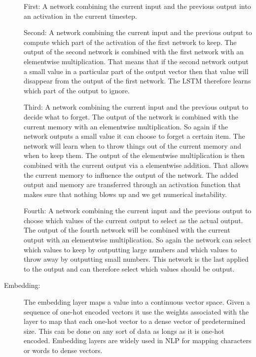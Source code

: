 \begin{description}
        First: A network combining the current input and the previous output
        into an activation in the current timestep.

        Second: A network combining the current input and the previous output to
        compute which part of the activation of the first network to keep. The
        output of the second network is combined with the first network with an
        elementwise multiplication. That means that if the second network output
        a small value in a particular part of the output vector then that value
        will disappear from the output of the first network. The \gls{LSTM}
        therefore learns which part of the output to ignore.

        Third: A network combining the current input and the previous output
        to decide what to forget. The output of the network is combined with
        the current memory with an elementwise multiplication. So again if the
        network outputs a small value it can choose to forget a certain item.
        The network will learn when to throw things out of the current memory
        and when to keep them. The output of the elementwise multiplication is
        then combined with the current output via a elementwise addition. That
        allows the current memory to influence the output of the network. The
        added output and memory are transferred through an activation function
        that makes sure that nothing blows up and we get numerical instability.

        Fourth: A network combining the current input and the previous output
        to choose which values of the current output to select as the actual
        output. The output of the fourth network will be combined with the
        current output with an elementwise multiplication. So again the network
        can select which values to keep by outputting large numbers and which
        values to throw away by outputting small numbers. This network is the
        last applied to the output and can therefore select which values should
        be output.

    \item[Embedding:]

        The embedding layer maps a value into a continuous vector space. Given
        a sequence of one-hot encoded vectors it use the weights associated
        with the layer to map that each one-hot vector to a dense vector of
        predetermined size. This can be done on any sort of data as longs as it
        is one-hot encoded. Embedding layers are widely used in \gls{NLP}
        for mapping characters or words to dense vectors.


\end{description}
